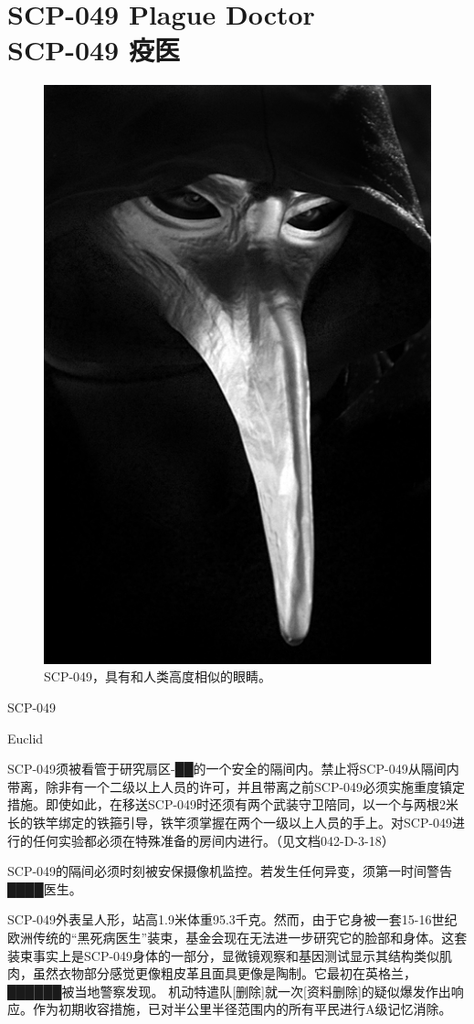 \chapter[SCP-049 疫医]{
    SCP-049 Plague Doctor\\
    SCP-049 疫医
}

\label{chap:SCP-049}

\begin{figure}[H]
    \centering
    \includegraphics[width=0.5\linewidth]{images/SCP.049.jpg}
    \caption*{SCP-049，具有和人类高度相似的眼睛。}
\end{figure}

SCP-049

Euclid

SCP-049须被看管于研究扇区-██的一个安全的隔间内。禁止将SCP-049从隔间内带离，除非有一个二级以上人员的许可，并且带离之前SCP-049必须实施重度镇定措施。即使如此，在移送SCP-049时还须有两个武装守卫陪同，以一个与两根2米长的铁竿绑定的铁箍引导，铁竿须掌握在两个一级以上人员的手上。对SCP-049进行的任何实验都必须在特殊准备的房间内进行。（见文档042-D-3-18）

SCP-049的隔间必须时刻被安保摄像机监控。若发生任何异变，须第一时间警告████医生。

SCP-049外表呈人形，站高1.9米体重95.3千克。然而，由于它身被一套15-16世纪欧洲传统的“黑死病医生”装束，基金会现在无法进一步研究它的脸部和身体。这套装束事实上是SCP-049身体的一部分，显微镜观察和基因测试显示其结构类似肌肉，虽然衣物部分感觉更像粗皮革且面具更像是陶制。它最初在英格兰，██████被当地警察发现。 机动特遣队{[}删除]就一次{[}资料删除]的疑似爆发作出响应。作为初期收容措施，已对半公里半径范围内的所有平民进行A级记忆消除。

